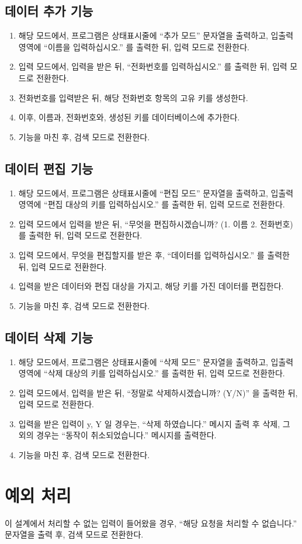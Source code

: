 \documentclass {article}
\begin{document}
\subsection{데이터 추가 기능}
\begin{enumerate}
\item 해당 모드에서, 프로그램은 상태표시줄에 ``추가 모드'' 문자열을 출력하고, 입출력 영역에 ``이름을 입력하십시오.'' 를 출력한 뒤, 입력 모드로 전환한다.
\item 입력 모드에서, 입력을 받은 뒤, ``전화번호를 입력하십시오.'' 를 출력한 뒤, 입력 모드로 전환한다.
\item 전화번호를 입력받은 뒤, 해당 전화번호 항목의 고유 키를 생성한다.
\item 이후, 이름과, 전화번호와, 생성된 키를 데이터베이스에 추가한다.
\item 기능을 마친 후, 검색 모드로 전환한다.
\end{enumerate}
\subsection{데이터 편집 기능}
\begin{enumerate}
\item 해당 모드에서, 프로그램은 상태표시줄에 ``편집 모드'' 문자열을 출력하고, 입출력 영역에 ``편집 대상의 키를 입력하십시오.'' 를 출력한 뒤, 입력 모드로 전환한다.
\item 입력 모드에서 입력을 받은 뒤, ``무엇을 편집하시겠습니까? (1. 이름 2. 전화번호) 를 출력한 뒤, 입력 모드로 전환한다.
\item 입력 모드에서, 무엇을 편집할지를 받은 후, ``데이터를 입력하십시오.'' 를 출력한 뒤, 입력 모드로 전환한다.
\item 입력을 받은 데이터와 편집 대상을 가지고, 해당 키를 가진 데이터를 편집한다.
\item 기능을 마친 후, 검색 모드로 전환한다.
\end{enumerate}
\subsection{데이터 삭제 기능}
\begin{enumerate}
\item 해당 모드에서, 프로그램은 상태표시줄에 ``삭제 모드'' 문자열을 출력하고, 입출력 영역에 ``삭제 대상의 키를 입력하십시오.'' 를 출력한 뒤, 입력 모드로 전환한다.
\item 입력 모드에서, 입력을 받은 뒤, ``정말로 삭제하시겠습니까? (Y/N)'' 을 출력한 뒤, 입력 모드로 전환한다.
\item 입력을 받은 입력이 y, Y 일 경우는, ``삭제 하였습니다.'' 메시지 출력 후 삭제, 그 외의 경우는 ``동작이 취소되었습니다.'' 메시지를 출력한다.
\item 기능을 마친 후, 검색 모드로 전환한다.
\end{enumerate}
\section{예외 처리}
이 설계에서 처리할 수 없는 입력이 들어왔을 경우, ``해당 요청을 처리할 수 없습니다.'' 문자열을 출력 후, 검색 모드로 전환한다.
\end{document}
